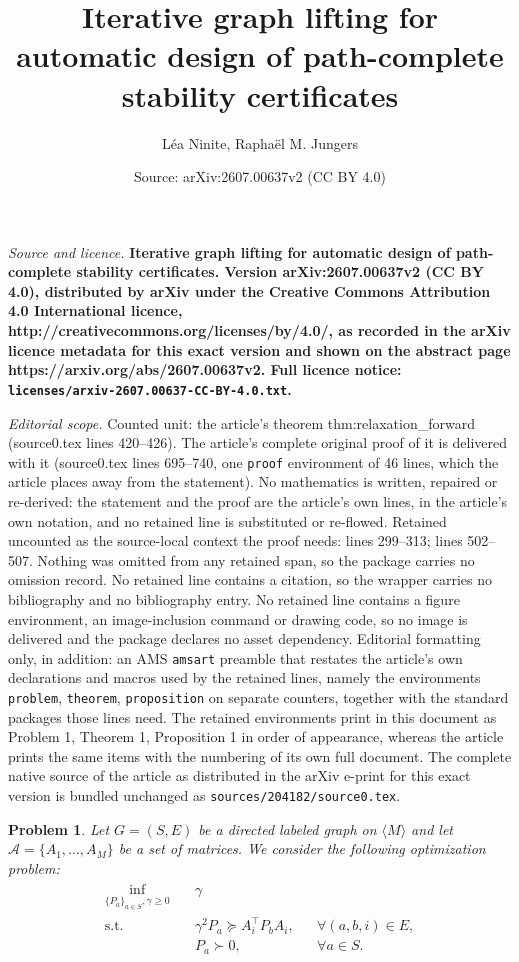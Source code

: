 \documentclass[10pt,a4paper]{amsart}
\title{\LARGE \bf Iterative graph lifting for automatic design of path-complete stability certificates}
\author{L\'ea Ninite, Rapha\"el M. Jungers}
\date{Source: arXiv:2607.00637v2 (CC BY 4.0)}
\newtheorem{problem}{Problem}
\newcommand{\Mset}{\langle M\rangle}
\begin{document}
\maketitle

\noindent\emph{Source and licence.} \LARGE \bf Iterative graph lifting for automatic design of path-complete stability certificates. Version arXiv:2607.00637v2 (CC BY 4.0), distributed by arXiv under the Creative Commons Attribution 4.0 International licence, http://creativecommons.org/licenses/by/4.0/, as recorded in the arXiv licence metadata for this exact version and shown on the abstract page https://arxiv.org/abs/2607.00637v2. Full licence notice: \texttt{licenses/arxiv-2607.00637-CC-BY-4.0.txt}.\par\smallskip

\noindent\textit{Editorial scope.} Counted unit: the article's theorem thm:relaxation\_forward (source0.tex lines 420--426). The article's complete original proof of it is delivered with it (source0.tex lines 695--740, one \texttt{proof} environment of 46 lines, which the article places away from the statement). No mathematics is written, repaired or re-derived: the statement and the proof are the article's own lines, in the article's own notation, and no retained line is substituted or re-flowed.  Retained uncounted as the source-local context the proof needs: lines 299--313; lines 502--507.  Nothing was omitted from any retained span, so the package carries no omission record.  No retained line contains a citation, so the wrapper carries no bibliography and no bibliography entry.  No retained line contains a figure environment, an image-inclusion command or drawing code, so no image is delivered and the package declares no asset dependency.  Editorial formatting only, in addition: an AMS \texttt{amsart} preamble that restates the article's own declarations and macros used by the retained lines, namely the environments \texttt{problem}, \texttt{theorem}, \texttt{proposition} on separate counters, together with the standard packages those lines need.  The retained environments print in this document as Problem 1, Theorem 1, Proposition 1 in order of appearance, whereas the article prints the same items with the numbering of its own full document.  The complete native source of the article as distributed in the arXiv e-print for this exact version is bundled unchanged as \texttt{sources/204182/source0.tex}.
\begin{problem}
Let $G=(S,E)$ be a directed labeled graph on $\Mset$ and let
$\mathcal A=\{A_1,\dots,A_M\}$ be a set of matrices. We consider the
following optimization problem:
\begin{align*}
\begin{aligned}
\inf_{\{P_a\}_{a\in S}, \gamma\ge 0} \quad & \gamma \\[1mm]
\text{s.t.} \quad
& \gamma^2 P_a \succeq A_i^\top P_b A_i, && \forall (a,b,i)\in E, \\[1mm]
& P_a \succ 0, && \forall a\in S .
\end{aligned}
\end{align*}
\label{prob:graph_opt}
\end{problem}
\end{document}
